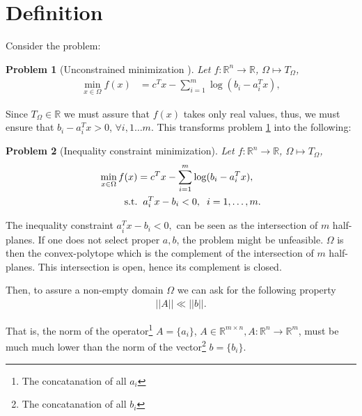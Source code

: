 \documentclass[a4paper,8pt,twocolumn]{article}
\DeclareMathOperator{\subjectto}{\mathrm{s.t.}}
\newtheorem{problem}{Problem}
\begin{document}
\section*{Definition}
Consider the problem:
\begin{problem} [Unconstrained minimization ]\label{prob1}
Let $ f : \mathbb{R}^{n} \rightarrow \mathbb{R}$, $\Omega \mapsto T_\Omega$,
\begin{equation}
\begin{aligned}
\min_{x\in \Omega}f(x)&=c^Tx-\sum_{i=1}^m\log(b_i-a_i^Tx),
\end{aligned}
\end{equation}
\end{problem}
%
Since $T_\Omega\in\mathbb{R}$ we must assure that $f(x)$ takes only real values, thus, we must ensure that $b_i-a_i^Tx>0$, $\forall i, 1\dots m$. This transforms problem \ref{prob1} into the following:
\begin{problem}[Inequality constraint minimization]
Let $ f : \mathbb{R}^{n} \rightarrow \mathbb{R}$, $\Omega \mapsto T_\Omega$,
\begin{equation}
\begin{aligned}
\min_{x\in \Omega}f(x)&=c^Tx-\sum_{i=1}^m\log(b_i-a_i^Tx),\\
\subjectto &\hspace{0.2cm} a_i^Tx - b_i < 0, \hspace{0.2cm} i=1,\dots,m.
\end{aligned}
\end{equation}
\end{problem}
The inequality constraint $a_i^Tx - b_i < 0,$ can be seen as the intersection of $m$ half-planes. If one does not select proper $a,b$, the problem might be unfeasible.  $\Omega$ is then the convex-polytope which is the complement of the intersection of $m$ half-planes. This intersection is open, hence its complement is closed. 

Then, to assure a non-empty domain $\Omega$ we can ask for the following property
\begin{equation}
\begin{aligned}
||A|| \ll ||b||.
\end{aligned}
\end{equation}

That is, the norm of the operator\footnote{The concatanation of all $a_i$} $A=\{a_i\}$, $A\in \mathbb{R}^{m\times n}, A: \mathbb{R}^n \rightarrow \mathbb{R}^m$, must be much much lower than the norm of the vector\footnote{The concatanation of all $b_i$}  $b=\{b_i\}$. 
\end{document}
